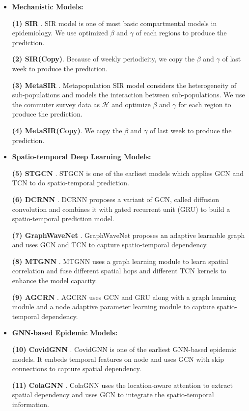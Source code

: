 \documentclass[lettersize,journal]{IEEEtran}
\begin{document}
\begin{itemize}
    \item \noindent\textbf{Mechanistic Models:}
    
    \textbf{(1) SIR} \cite{ref_11}. SIR model is one of most basic compartmental models in epidemiology. We use optimized $\beta$ and $\gamma$ of each regions to produce the prediction.

    \textbf{(2) SIR(Copy)}. Because of weekly periodicity, we copy the $\beta$ and $\gamma$ of last week to produce the prediction. 
    
    \textbf{(3) MetaSIR} \cite{ref_2}. Metapopulation SIR model considers the heterogeneity of sub-populations and models the interaction between sub-populations. We use the commuter survey data as $\mathcal H$ and optimize $\beta$ and $\gamma$ for each region to produce the prediction. 
    
    \textbf{(4) MetaSIR(Copy)}. We copy the $\beta$ and $\gamma$ of last week to produce the prediction. 

    \item\noindent\textbf{Spatio-temporal Deep Learning Models:} 
    
    \textbf{(5) STGCN} \cite{ref_21}. STGCN is one of the earliest models which applies GCN and TCN to do spatio-temporal prediction. 
    
    \textbf{(6) DCRNN} \cite{ref_22}. DCRNN proposes a variant of GCN, called diffusion convolution and combines it with gated recurrent unit (GRU) to build a spatio-temporal prediction model. 
    
    \textbf{(7) GraphWaveNet} \cite{ref_23}. GraphWaveNet proposes an adaptive learnable graph and uses GCN and TCN to capture spatio-temporal dependency.  
    
    \textbf{(8) MTGNN} \cite{ref_26}. MTGNN uses a graph learning module to learn spatial correlation and fuse different spatial hops and different TCN kernels to enhance the model capacity. 
    
    \textbf{(9) AGCRN} \cite{ref_27}. AGCRN uses GCN and GRU along with a graph learning module and a node adaptive parameter learning module to capture spatio-temporal dependency.
    
    
    \item\noindent\textbf{GNN-based Epidemic Models:} 
    
    \textbf{(10) CovidGNN} \cite{ref_10}. CovidGNN is one of the earliest GNN-based epidemic models. It embeds temporal features on node and uses GCN with skip connections to capture spatial dependency. 
    
    \textbf{(11) ColaGNN} \cite{ref_9}. ColaGNN uses the location-aware attention to extract spatial dependency and uses GCN to integrate the spatio-temporal information.

\end{itemize}
\end{document}
